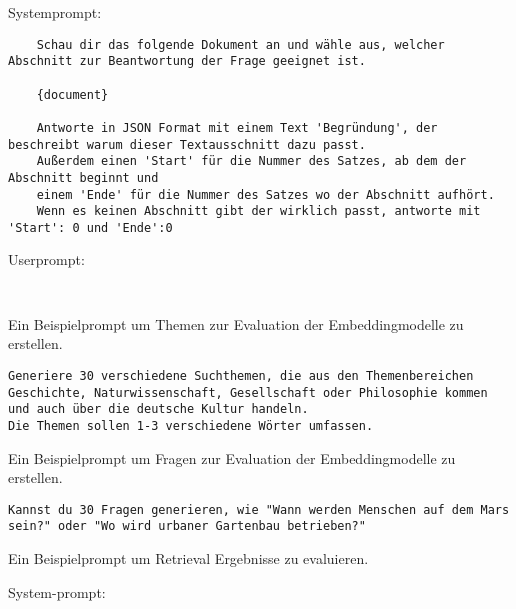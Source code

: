 Systemprompt:

\begin{verbatim}
    Schau dir das folgende Dokument an und wähle aus, welcher Abschnitt zur Beantwortung der Frage geeignet ist.

    {document}

    Antworte in JSON Format mit einem Text 'Begründung', der beschreibt warum dieser Textausschnitt dazu passt. 
    Außerdem einen 'Start' für die Nummer des Satzes, ab dem der Abschnitt beginnt und 
    einem 'Ende' für die Nummer des Satzes wo der Abschnitt aufhört.
    Wenn es keinen Abschnitt gibt der wirklich passt, antworte mit 'Start': 0 und 'Ende':0

\end{verbatim}

Userprompt:

\begin{verbatim}
  

\end{verbatim}


\label{ch:chatgpt-topicgeneration}

Ein Beispielprompt um Themen zur Evaluation der Embeddingmodelle zu erstellen.

\begin{verbatim}
Generiere 30 verschiedene Suchthemen, die aus den Themenbereichen Geschichte, Naturwissenschaft, Gesellschaft oder Philosophie kommen und auch über die deutsche Kultur handeln.
Die Themen sollen 1-3 verschiedene Wörter umfassen.
\end{verbatim}

\label{ch:chatgpt-questiongeneration}

Ein Beispielprompt um Fragen zur Evaluation der Embeddingmodelle zu erstellen.

\begin{verbatim}
Kannst du 30 Fragen generieren, wie "Wann werden Menschen auf dem Mars sein?" oder "Wo wird urbaner Gartenbau betrieben?"
\end{verbatim}

\label{ch:chatgpt-evaluation}

Ein Beispielprompt um Retrieval Ergebnisse zu evaluieren.

System-prompt:

